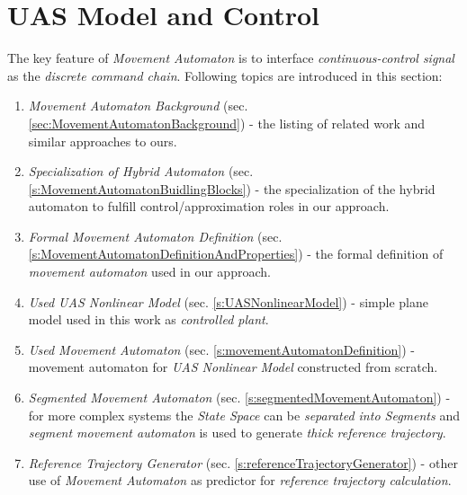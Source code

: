 \cleardoublepage
\section{UAS Model and Control}\label{s:modelMAImplementation}

\noindent The key feature of \emph{Movement Automaton} is to interface \emph{continuous-control signal} as the \emph{discrete command chain}. Following topics are introduced in this section:

\begin{enumerate}
	\item \emph{Movement Automaton Background} (sec. \ref{sec:MovementAutomatonBackground}) - the listing of related work and similar approaches to ours.
	
	\item \emph{Specialization of Hybrid Automaton} (sec. \ref{s:MovementAutomatonBuidlingBlocks}) - the specialization of the hybrid automaton to fulfill control/approximation roles in our approach.
	
	\item \emph{Formal Movement Automaton Definition} (sec. \ref{s:MovementAutomatonDefinitionAndProperties}) - the formal definition of \emph{movement automaton} used in our approach.
	
    \item \emph{Used UAS Nonlinear Model} (sec. \ref{s:UASNonlinearModel}) - simple plane model used in this work as \emph{controlled plant}.
    
    \item \emph{Used Movement Automaton} (sec. \ref{s:movementAutomatonDefinition}) - movement automaton for \emph{UAS Nonlinear Model} constructed from scratch.
    
    \item \emph{Segmented Movement Automaton} (sec. \ref{s:segmentedMovementAutomaton}) - for more complex systems the \emph{State Space} can be \emph{separated into Segments} and \emph{segment movement automaton} is used to generate \emph{thick reference trajectory}.
    
    \item \emph{Reference Trajectory Generator} (sec. \ref{s:referenceTrajectoryGenerator}) - other use of \emph{Movement Automaton} as predictor for \emph{reference trajectory calculation}.
\end{enumerate}



